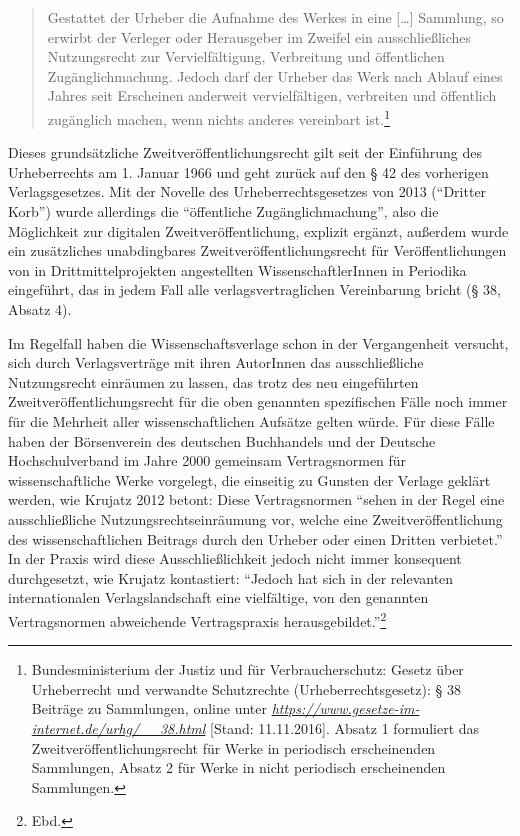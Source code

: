 \documentclass[a4paper,
fontsize=11pt,
oneside,
numbers=noperiodatend,
parskip=half-,
bibliography=totoc,
final
]{scrartcl}
\begin{document}
\begin{quote}
Gestattet der Urheber die Aufnahme des Werkes in eine {[}\ldots{}{]}
Sammlung, so erwirbt der Verleger oder Herausgeber im Zweifel ein
ausschließliches Nutzungsrecht zur Vervielfältigung, Verbreitung und
öffentlichen Zugänglichmachung. Jedoch darf der Urheber das Werk nach
Ablauf eines Jahres seit Erscheinen anderweit vervielfältigen,
verbreiten und öffentlich zugänglich machen, wenn nichts anderes
vereinbart ist.\footnote{Bundesministerium der Justiz und für
  Verbraucherschutz: Gesetz über Urheberrecht und verwandte Schutzrechte
  (Urheberrechtsgesetz): § 38 Beiträge zu Sammlungen, online unter
  \href{https://www.gesetze-im-internet.de/urhg/__38.html}{\emph{https://www.gesetze-im-internet.de/urhg/\_\_38.html}}
  {[}Stand: 11.11.2016{]}. Absatz 1 formuliert das
  Zweitveröffentlichungsrecht für Werke in periodisch erscheinenden
  Sammlungen, Absatz 2 für Werke in nicht periodisch erscheinenden
  Sammlungen.}
\end{quote}

Dieses grundsätzliche Zweitveröffentlichungsrecht gilt seit der
Einführung des Urheberrechts am 1. Januar 1966 und geht zurück auf den §
42 des vorherigen Verlagsgesetzes. Mit der Novelle des
Urheberrechtsgesetzes von 2013 (\enquote{Dritter Korb}) wurde allerdings
die \enquote{öffentliche Zugänglichmachung}, also die Möglichkeit zur
digitalen Zweitveröffentlichung, explizit ergänzt, außerdem wurde ein
zusätzliches unabdingbares Zweitveröffentlichungsrecht für
Veröffentlichungen von in Drittmittelprojekten angestellten
WissenschaftlerInnen in Periodika eingeführt, das in jedem Fall alle
verlagsvertraglichen Vereinbarung bricht (§ 38, Absatz 4).

Im Regelfall haben die Wissenschaftsverlage schon in der Vergangenheit
versucht, sich durch Verlagsverträge mit ihren AutorInnen das
ausschließliche Nutzungsrecht einräumen zu lassen, das trotz des neu
eingeführten Zweitveröffentlichungsrecht für die oben genannten
spezifischen Fälle noch immer für die Mehrheit aller wissenschaftlichen
Aufsätze gelten würde. Für diese Fälle haben der Börsenverein des
deutschen Buchhandels und der Deutsche Hochschulverband im Jahre 2000
gemeinsam Vertragsnormen für wissenschaftliche Werke vorgelegt, die
einseitig zu Gunsten der Verlage geklärt werden, wie Krujatz 2012
betont: Diese Vertragsnormen \enquote{sehen in der Regel eine
ausschließliche Nutzungsrechtseinräumung vor, welche eine
Zweitveröffentlichung des wissenschaftlichen Beitrags durch den Urheber
oder einen Dritten verbietet.} In der Praxis wird diese
Ausschließlichkeit jedoch nicht immer konsequent durchgesetzt, wie
Krujatz kontastiert: \enquote{Jedoch hat sich in der relevanten
internationalen Verlagslandschaft eine vielfältige, von den genannten
Vertragsnormen abweichende Vertragspraxis herausgebildet.}\footnote{Ebd.}
\end{document}
